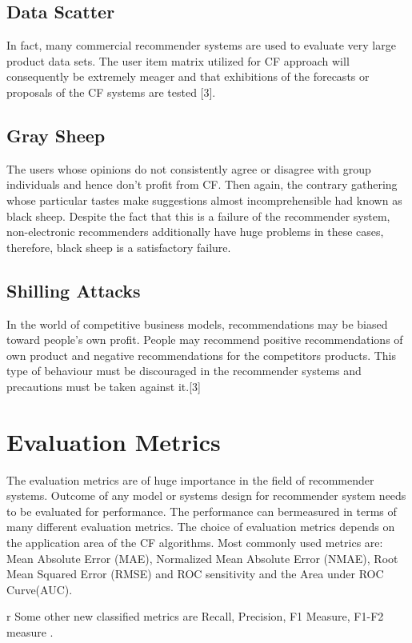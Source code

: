 \documentclass[10pt,conference]{IEEEtran}
\begin{document}
\subsection{Data Scatter}
In fact, many commercial recommender systems are used to evaluate very large product data sets. The user item matrix utilized for CF approach will consequently be extremely meager and that exhibitions of the forecasts or proposals of the CF systems are tested [3].

\subsection{Gray Sheep}
The users whose opinions do not consistently agree or disagree with group individuals and hence don't profit from CF. Then again, the contrary gathering whose particular tastes make suggestions almost incomprehensible had known as black sheep. Despite the fact that this is a failure of the recommender system, non-electronic recommenders additionally have huge problems in these cases, therefore, black sheep is a satisfactory failure.

\subsection{Shilling Attacks}
In the world of competitive business models, recommendations may be biased toward people's own profit. People may recommend positive recommendations of own product and negative recommendations for the competitors products. This type of behaviour must be discouraged in the recommender systems and precautions must be taken against it.[3]


\section{Evaluation Metrics}

The evaluation metrics are of huge importance in the field of recommender systems. Outcome of any model or systems design for recommender system needs to be evaluated for performance. The performance can be{\color{white}r}measured in terms of many different evaluation metrics. The choice of evaluation metrics depends on the application area of the CF algorithms. Most commonly used metrics are: Mean Absolute Error (MAE), Normalized Mean Absolute Error (NMAE), Root Mean Squared Error (RMSE) and ROC sensitivity and the Area under ROC Curve(AUC).

{\color{white}r}
Some other new classified metrics are Recall, Precision, F1 Measure, F1-F2 measure \cite{heree}.\\
\end{document}
